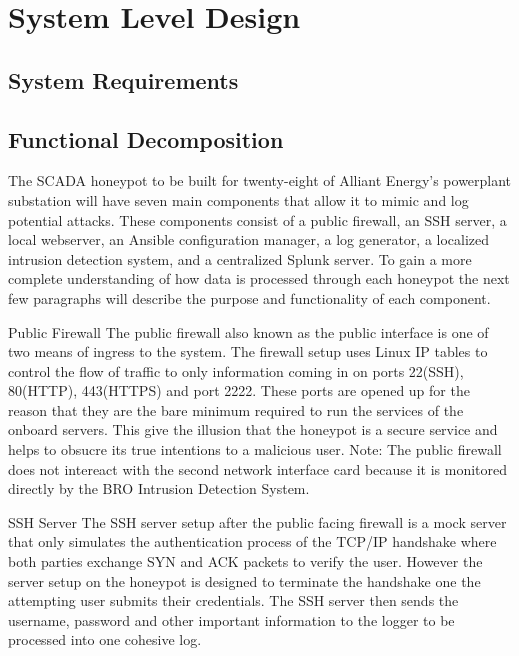 \chapter{System Level Design}

\blindtext

\section{System Requirements}

\Blindtext

\section{Functional Decomposition}

The SCADA honeypot to be built for twenty-eight of Alliant Energy's powerplant substation will have seven main components that allow it to mimic and log potential attacks.  These components consist of a public firewall, an SSH server, a local webserver, an Ansible configuration manager, a log generator, a localized intrusion detection system, and a centralized Splunk server.  To gain a more complete understanding of how data is processed through each honeypot the next few paragraphs will describe the purpose and functionality of each component.

Public Firewall
The public firewall also known as the public interface is one of two means of ingress to the system.  The firewall setup uses Linux IP tables to control the flow of traffic to only information coming in on ports 22(SSH), 80(HTTP), 443(HTTPS) and port 2222.  These ports are opened up for the reason that they are the bare minimum required to run the services of the onboard servers.  This give the illusion that the honeypot is a secure service and helps to obsucre its true intentions to a malicious user.  Note: The public firewall does not intereact with the second network interface card because it is monitored directly by the BRO Intrusion Detection System.

SSH Server
The SSH server setup after the public facing firewall is a mock server that only simulates the authentication process of the TCP/IP handshake where both parties exchange SYN and ACK packets to verify the user.  However the server setup on the honeypot is designed to terminate the handshake one the attempting user submits their credentials.  The SSH server then sends the username, password and other important information to the logger to be processed into one cohesive log.

